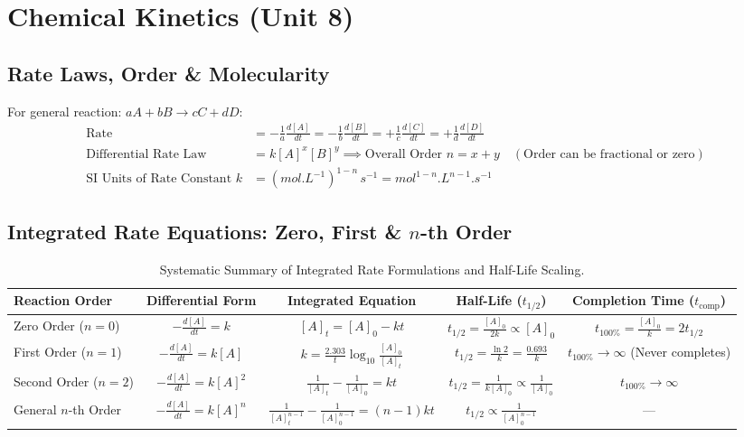 \documentclass[11pt,a4paper]{article}
\begin{document}
\newpage

\section{Chemical Kinetics (Unit 8)}

\subsection{Rate Laws, Order \& Molecularity}

\begin{formulabox}
For general reaction: $aA + bB \to cC + dD$:
\begin{align}
  \text{Rate} &= -\frac{1}{a}\frac{d[A]}{dt} = -\frac{1}{b}\frac{d[B]}{dt} = +\frac{1}{c}\frac{d[C]}{dt} = +\frac{1}{d}\frac{d[D]}{dt} \\
  \text{Differential Rate Law} &= k[A]^x[B]^y \implies \text{Overall Order } n = x + y \quad (\text{Order can be fractional or zero}) \\
  \text{SI Units of Rate Constant } k &= (\si{mol.L^{-1}})^{1-n}\,\si{s^{-1}} = \si{mol^{1-n}.L^{n-1}.s^{-1}}
\end{align}
\end{formulabox}

\subsection{Integrated Rate Equations: Zero, First \& $n$-th Order}

\begin{table}[htbp]
\centering
\small
\renewcommand{\arraystretch}{1.3}
\begin{tabularx}{\textwidth}{L c c c c}
\toprule
\textbf{Reaction Order} & \textbf{Differential Form} & \textbf{Integrated Equation} & \textbf{Half-Life ($t_{1/2}$)} & \textbf{Completion Time ($t_{\text{comp}}$)} \\
\midrule
Zero Order ($n=0$) & $-\frac{d[A]}{dt} = k$ & $[A]_t = [A]_0 - kt$ & $t_{1/2} = \frac{[A]_0}{2k} \propto [A]_0$ & $t_{100\%} = \frac{[A]_0}{k} = 2t_{1/2}$ \\
First Order ($n=1$) & $-\frac{d[A]}{dt} = k[A]$ & $k = \frac{2.303}{t}\log_{10}\frac{[A]_0}{[A]_t}$ & $t_{1/2} = \frac{\ln 2}{k} = \frac{0.693}{k}$ & $t_{100\%} \to \infty$ (Never completes) \\
Second Order ($n=2$) & $-\frac{d[A]}{dt} = k[A]^2$ & $\frac{1}{[A]_t} - \frac{1}{[A]_0} = kt$ & $t_{1/2} = \frac{1}{k[A]_0} \propto \frac{1}{[A]_0}$ & $t_{100\%} \to \infty$ \\
General $n$-th Order & $-\frac{d[A]}{dt} = k[A]^n$ & $\frac{1}{[A]_t^{n-1}} - \frac{1}{[A]_0^{n-1}} = (n-1)kt$ & $t_{1/2} \propto \frac{1}{[A]_0^{n-1}}$ & --- \\
\bottomrule
\end{tabularx}
\caption{Systematic Summary of Integrated Rate Formulations and Half-Life Scaling.}
\end{table}
\end{document}
